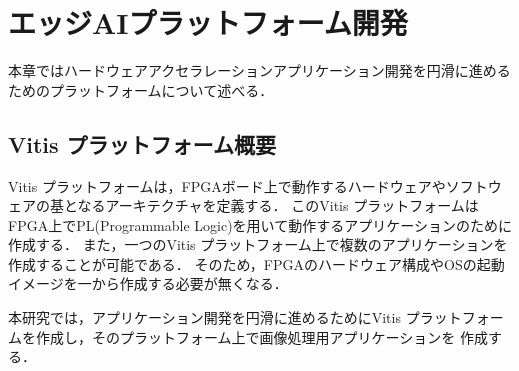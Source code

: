 \documentclass[11pt,a4j]{jreport}
\begin{document}
\chapter{エッジAIプラットフォーム開発}
本章ではハードウェアアクセラレーションアプリケーション開発を円滑に進めるためのプラットフォームについて述べる．
\section{Vitis プラットフォーム概要}
Vitis プラットフォーム\cite{VitisPlatform}は，FPGAボード上で動作するハードウェアやソフトウェアの基となるアーキテクチャを定義する．
このVitis プラットフォームはFPGA上でPL(Programmable Logic)を用いて動作するアプリケーションのために作成する．
また，一つのVitis プラットフォーム上で複数のアプリケーションを作成することが可能である．
そのため，FPGAのハードウェア構成やOSの起動イメージを一から作成する必要が無くなる．

本研究では，アプリケーション開発を円滑に進めるためにVitis プラットフォームを作成し，そのプラットフォーム上で画像処理用アプリケーションを
作成する．

\end{document}
